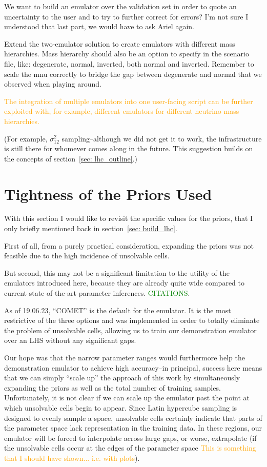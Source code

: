 We want to build an emulator over the validation set in order to quote an 
uncertainty to the user and to try to further correct for errors? I'm not sure 
I understood that last part, we would have to ask Ariel again.

Extend the two-emulator solution to create emulators with different mass
hierarchies. Mass hierarchy should also be an option to specify in the
scenario file, like: degenerate, normal, inverted, both normal and inverted. 
Remember to scale the mnu correctly to bridge the gap between degenerate and
normal that we observed when playing around.

\textcolor{orange}{The integration of 
multiple emulators into one user-facing script can be further exploited with, 
for example, different emulators for different neutrino mass hierarchies.}

(For example, $\sigma_{12}^2$ sampling--although we did not
get it to work, the infrastructure is still there for whomever comes along in
the future. This suggestion builds on the concepts of
section~\ref{sec: lhc_outline}.)

\section{Tightness of the Priors Used}
\label{sec: prior_woes}

With this section I would like to revisit the specific values for the priors,
that I only briefly mentioned back in section~\ref{sec: build_lhc}.

First of all, from a purely practical consideration, expanding the priors was
not feasible due to the high incidence of unsolvable cells.

But second, this may not be a significant limitation to the utility of the
emulators introduced here, because they are already quite wide compared to
current state-of-the-art parameter inferences. \textcolor{green}{CITATIONS}.

As of 19.06.23, ``COMET'' is the default for the emulator. It is the most 
restrictive of the three options and was implemented in order to totally 
eliminate the problem of unsolvable cells, allowing us to train our 
demonstration emulator over an LHS without any significant gaps.

Our hope was that the narrow parameter ranges would furthermore help the 
demonstration emulator to achieve high accuracy--in principal, success here
means that we can simply ``scale up'' the approach of this work by
simultaneously expanding the priors as well as the total number of training
samples. Unfortunately, it is not clear if we can scale up the emulator past
the point at which unsolvable cells begin to appear. Since Latin hypercube
sampling is designed to evenly sample a space, unsolvable cells certainly
indicate that parts of the parameter space lack representation in the training
data. In these regions, our emulator will be forced to interpolate across
large gaps, or worse, extrapolate (if the unsolvable cells occur at the edges
of the parameter space \textcolor{orange}{This is something that I should have
shown... i.e. with plots}).

